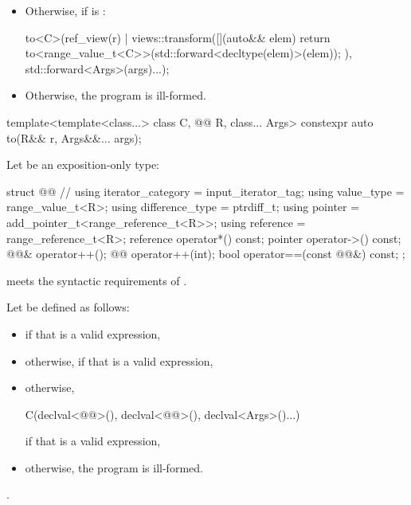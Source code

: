 \begin{itemdescr}
\begin{itemize}
\item
Otherwise,
if  is :
\begin{codeblock}
to<C>(ref_view(r) | views::transform([](auto&& elem) {
  return to<range_value_t<C>>(std::forward<decltype(elem)>(elem));
}), std::forward<Args>(args)...);
\end{codeblock}

\item
Otherwise, the program is ill-formed.
\end{itemize}
\end{itemdescr}

%
\begin{itemdecl}
template<template<class...> class C, @@ R, class... Args>
  constexpr auto to(R&& r, Args&&... args);
\end{itemdecl}

\begin{itemdescr}
\pnum
Let  be an exposition-only type:
\begin{codeblock}
struct @@ {                        // \expos
  using iterator_category = input_iterator_tag;
  using value_type = range_value_t<R>;
  using difference_type = ptrdiff_t;
  using pointer = add_pointer_t<range_reference_t<R>>;
  using reference = range_reference_t<R>;
  reference operator*() const;
  pointer operator->() const;
  @@& operator++();
  @@ operator++(int);
  bool operator==(const @@&) const;
};
\end{codeblock}
\begin{note}
 meets
the syntactic requirements of .
\end{note}

\pnum
Let  be defined as follows:
\begin{itemize}
\item
{} if that is a valid expression,
\item
otherwise, 
if that is a valid expression,
\item
otherwise,
\begin{codeblock}
C(declval<@@>(), declval<@@>(), declval<Args>()...)
\end{codeblock}
if that is a valid expression,
\item
otherwise, the program is ill-formed.
\end{itemize}

\pnum
\returns
{}.
\end{itemdescr}

